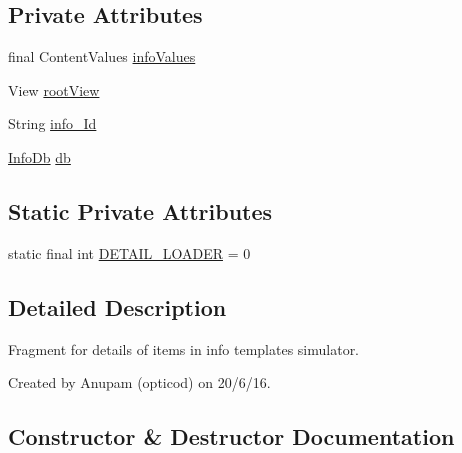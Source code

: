 \subsection*{Private Attributes}
\begin{DoxyCompactItemize}
\item 
final Content\+Values \hyperlink{classorg_1_1buildmlearn_1_1toolkit_1_1infotemplate_1_1fragment_1_1DetailActivityFragment_a0066a708cc32fde3ae05581017773f60}{info\+Values}
\item 
View \hyperlink{classorg_1_1buildmlearn_1_1toolkit_1_1infotemplate_1_1fragment_1_1DetailActivityFragment_adc5f6819dcdcd513a8178de20a148a32}{root\+View}
\item 
String \hyperlink{classorg_1_1buildmlearn_1_1toolkit_1_1infotemplate_1_1fragment_1_1DetailActivityFragment_af73685fcf9019fdd69ab2c6322ddc929}{info\+\_\+\+Id}
\item 
\hyperlink{classorg_1_1buildmlearn_1_1toolkit_1_1infotemplate_1_1data_1_1InfoDb}{Info\+Db} \hyperlink{classorg_1_1buildmlearn_1_1toolkit_1_1infotemplate_1_1fragment_1_1DetailActivityFragment_aae9761b393ec8d482f96c222e25700be}{db}
\end{DoxyCompactItemize}
\subsection*{Static Private Attributes}
\begin{DoxyCompactItemize}
\item 
static final int \hyperlink{classorg_1_1buildmlearn_1_1toolkit_1_1infotemplate_1_1fragment_1_1DetailActivityFragment_ab5efe7dbb13895e450cac8152ae604c1}{D\+E\+T\+A\+I\+L\+\_\+\+L\+O\+A\+D\+ER} = 0
\end{DoxyCompactItemize}


\subsection{Detailed Description}
Fragment for details of items in info template\textquotesingle{}s simulator. 

Created by Anupam (opticod) on 20/6/16. 

\subsection{Constructor \& Destructor Documentation}
